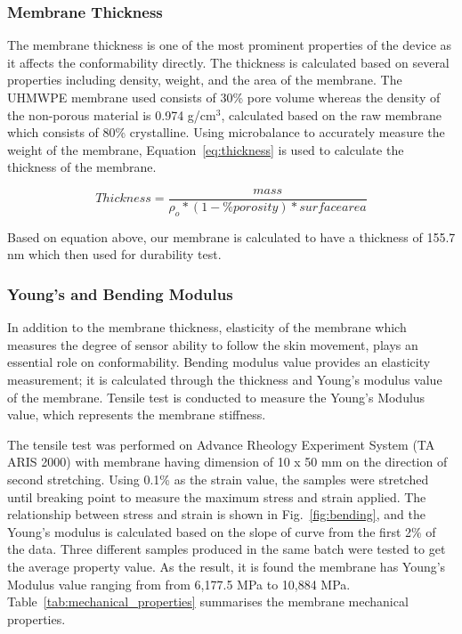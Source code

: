 \documentclass[journal]{IEEEtran}
\begin{document}
\subsubsection{Membrane Thickness}

The membrane thickness is one of the most prominent properties of the device as it affects the conformability directly. The thickness is calculated based on several properties including density, weight, and the area of the membrane. The UHMWPE membrane used consists of 30\% pore volume whereas the density of the non-porous material is 0.974 g/cm$^3$, calculated based on the raw membrane which consists of 80\% crystalline. Using microbalance to accurately measure the weight of the membrane, Equation~\ref{eq:thickness} is used to calculate the thickness of the membrane.

\begin{equation}
    Thickness = \frac{mass}{\rho_o * (1 - \%porosity) * surface area}
    \label{eq:thickness}
\end{equation}

Based on equation above, our membrane is calculated to have a thickness of 155.7 nm which then used for durability test.

\subsubsection{Young's and Bending Modulus}

In addition to the membrane thickness, elasticity of the membrane which measures the degree of sensor ability to follow the skin movement, plays an essential role on conformability. Bending modulus value provides an elasticity measurement; it is calculated through the thickness and Young’s modulus value of the membrane. Tensile test is conducted to measure the Young’s Modulus value, which represents the membrane stiffness.

The tensile test was performed on Advance Rheology Experiment System (TA ARIS 2000) with membrane having dimension of 10 x 50 mm on the direction of second stretching. Using 0.1\% as the strain value, the samples were stretched until breaking point to measure the maximum stress and strain applied. The relationship between stress and strain is shown in Fig.~\ref{fig:bending}, and the Young’s modulus is calculated based on the slope of curve from the first 2\% of the data. Three different samples produced in the same batch were tested to get the average property value. As the result, it is found the membrane has Young’s Modulus value ranging from from 6,177.5 MPa to 10,884 MPa. Table~\ref{tab:mechanical_properties} summarises the membrane mechanical properties.
\end{document}
